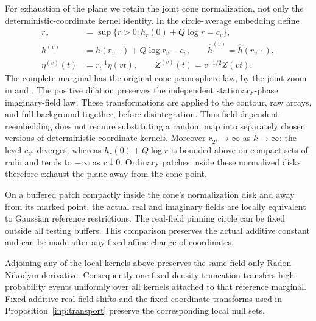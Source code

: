 For exhaustion of the plane we retain the joint cone normalization,
not only the deterministic-coordinate kernel identity.  In the
circle-average embedding define
\begin{equation}\label{inp:joint-zoom}
\begin{split}
 r_v&=\sup\{r>0:h_r(0)+Q\log r=c_v\},\\
 h^{(v)}&=h(r_v\,\cdot)+Q\log r_v-c_v,
 \qquad \widehat h^{(v)}=\widehat h(r_v\,\cdot),\\
 \eta^{(v)}(t)&=r_v^{-1}\eta(vt),
 \qquad Z^{(v)}(t)=v^{-1/2}Z(vt).
\end{split}
\end{equation}
The complete marginal has the original cone peanosphere law, by
the joint zoom in \cite{MetricMaps} and
\cite[Proposition~4.13(i)]{DMS}.  The positive dilation preserves
the independent stationary-phase imaginary-field law.  These
transformations are applied to the contour, raw arrays, and full
background together, before disintegration.  Thus field-dependent
reembedding does not require substituting a random map into
separately chosen versions of deterministic-coordinate kernels.
Moreover $r_{2^k}\to\infty$ as $k\to\infty$: the level $c_{2^k}$
diverges, whereas $h_r(0)+Q\log r$ is bounded above on compact
sets of radii and tends to $-\infty$ as $r\downarrow0$.
Ordinary patches inside these normalized disks therefore exhaust
the plane away from the cone point.

\begin{lemma}\label{inp:gaussian}
On a buffered patch compactly inside the cone's normalization
disk and away from its marked point, the actual real and
imaginary fields are locally equivalent to Gaussian reference
restrictions.  The real-field pinning circle can be fixed outside
all testing buffers.  This comparison preserves the actual
additive constant and can be made after any fixed affine change
of coordinates.

Adjoining any of the local kernels above preserves the same
field-only Radon--Nikodym derivative.  Consequently one fixed
density truncation transfers high-probability events uniformly
over all kernels attached to that reference marginal.  Fixed
additive real-field shifts and the fixed coordinate transforms
used in Proposition~\ref{inp:transport} preserve the corresponding
local null sets.
\end{lemma}

